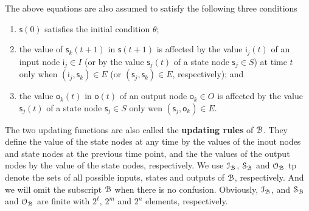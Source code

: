 \begin{definition}
\begin{itemize}
\begin{equation}
\label{equ:1}
\end{equation}
The above equations are also assumed to satisfy the following three conditions
\begin{enumerate}
\item $\mathsf{s}(0)$ satisfies the initial condition $\theta$;
\item the value of $\mathsf{s}_k(t+1)$ in $\mathsf{s}(t+1)$ is affected by the value  $\mathsf{i}_j(t)$ of an input node $\mathsf{i}_j \in I$ (or by the value $\mathsf{s}_j(t)$ of a state node $\mathsf{s}_j\in S$) at time $t$ only when $(\mathsf{i}_j, \mathsf{s}_k)\in E$ (or $(\mathsf{s}_j, \mathsf{s}_k)\in E$, respectively); and
\item the value $\mathsf{o}_k(t)$ in $\mathsf{o}(t)$ of an output node $\mathsf{o}_k\in O$ is affected by the value $\mathsf{s}_j(t)$ of a state node $\mathsf{s}_j\in S$ only wen $(\mathsf{s}_j,\mathsf{o}_k)\in E$.
\end{enumerate}
\end{itemize}

\end{definition}
 The two updating functions are also called the  {\bf updating rules}  of ${\mathcal{B}}$. They define the value of the state nodes at any time by the values of the inout nodes and state nodes at the previous time point, and the the values of the output nodes by the value of the state nodes, respectively. We use $\mathcal{I}_{\mathcal{B}}$, $\mathcal{S}_{\mathcal{B}}$ and $\mathcal{O}_{\mathcal{B}}$ tp denote  the sets of all possible inputs, states and outputs of ${\mathcal{B}}$, respectively. And we will omit the subscript ${\mathcal{B}}$ when there is no confusion. Obviously, $\mathcal{I}_{\mathcal{B}}$, and $\mathcal{S}_{\mathcal{B}}$ and $\mathcal{O}_{\mathcal{B}}$ are finite with $2^\ell$, $2^m$ and $2^n$ elements, respectively. 


